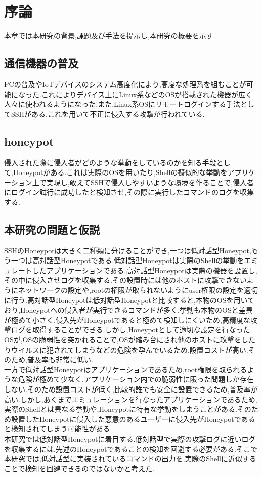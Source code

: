 \chapter{序論}
\label{intr}

本章では本研究の背景,課題及び手法を提示し,本研究の概要を示す.

\section{通信機器の普及}
\label{intr:back}
PCの普及やIoTデバイスのシステム高度化により,高度な処理系を組むことが可能になった.これによりデバイス上にLinux系などのOSが搭載された機器が広く人々に使われるようになった.また,Linux系OSにリモートログインする手法としてSSHがある.これを用いて不正に侵入する攻撃が行われている.

\section{honeypot}
\label{intr:honey}
 侵入された際に侵入者がどのような挙動をしているのかを知る手段として,Honeypotがある.これは実際のOSを用いたり,Shellの擬似的な挙動をアプリケーション上で実現し,敢えてSSHで侵入しやすいような環境を作ることで,侵入者にログイン試行に成功したと検知させ,その際に実行したコマンドのログを収集する.

\section{本研究の問題と仮説}
\label{intr:prob}
SSHのHoneypotは大きく二種類に分けることができ,一つは低対話型Honeypot,もう一つは高対話型Honeypotである.低対話型Honeypotは実際のShellの挙動をエミュレートしたアプリケーションである.高対話型Honeypotは実際の機器を設置し,その中に侵入させログを収集する.その設置時には他のホストに攻撃できないようにネットワークの設定や,rootの権限が取られないようにuser権限の設定を適切に行う.高対話型Honeypotは低対話型Honeypotと比較すると,本物のOSを用いており,Honeypotへの侵入者が実行できるコマンドが多く,挙動も本物のOSと差異が極めて小さく,侵入先がHoneypotであると極めて検知しにくいため,高精度な攻撃ログを取得することができる.しかし,Honeypotとして適切な設定を行なったOSが,OSの脆弱性を突かれることで,OSが踏み台にされ他のホストに攻撃をしたりウイルスに犯されてしまうなどの危険を孕んでいるため,設置コストが高い.そのため,普及率も非常に低い.\cite{highinthoney}\\一方で低対話型Honeypotはアプリケーションであるため,root権限を取られるような危険が極めて少なく,アプリケーション内での脆弱性に限った問題しか存在しない.そのため設置コストが低く,比較的誰でも安全に設置できるため,普及率が高い.しかし,あくまでエミュレーションを行なったアプリケーションであるため,実際のShellとは異なる挙動や,Honeypotに特有な挙動をしまうことがある.そのため設置したHoneypotに侵入した悪意のあるユーザーに侵入先がHoneypotであると検知されてしまう可能性がある.\\
本研究では低対話型Honeypotに着目する.低対話型で実際の攻撃ログに近いログを収集するには,先述のHoneypotであることの検知を回避する必要がある.そこで本研究では,低対話型に実装されているコマンドの出力を,実際のShellに近似することで検知を回避できるのではないかと考えた.

